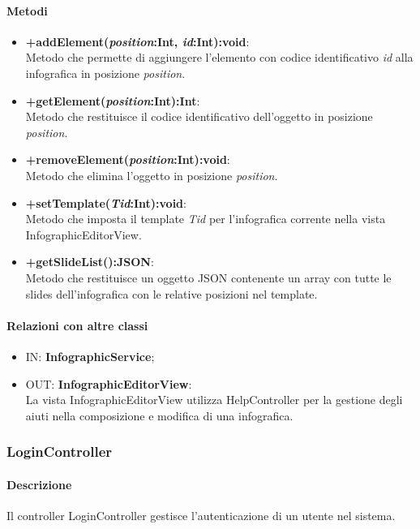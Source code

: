 	\paragraph{Metodi}
	\begin{itemize}
	  \item \textbf{+addElement(\textit{position}:Int, \textit{id}:Int):void}:\\
		  Metodo che permette di aggiungere l'elemento con codice identificativo \textit{id} alla infografica in posizione \textit{position}.
	  \item \textbf{+getElement(\textit{position}:Int):Int}:\\
		  Metodo che restituisce il codice identificativo dell'oggetto in posizione \textit{position}.
	  \item \textbf{+removeElement(\textit{position}:Int):void}:\\
		  Metodo che elimina l'oggetto in posizione \textit{position}.
	  \item \textbf{+setTemplate(\textit{Tid}:Int):void}:\\
		  Metodo che imposta il template \textit{Tid} per l'infografica corrente nella vista InfographicEditorView.
	  \item \textbf{+getSlideList():JSON}:\\
		  Metodo che restituisce un oggetto JSON contenente un array con tutte le slides dell'infografica con le relative posizioni nel template.
		  
	\end{itemize}
	\paragraph{Relazioni con altre classi}
	\begin{itemize}
	  \item IN: \textbf{InfographicService};
	  \item OUT: \textbf{InfographicEditorView}:\\
		La vista InfographicEditorView utilizza HelpController per la gestione degli aiuti nella composizione e modifica di una infografica. 	
	\end{itemize}
	
\subsubsection{LoginController}
\paragraph{Descrizione}
	Il controller LoginController gestisce l'autenticazione di un utente nel sistema.
	
